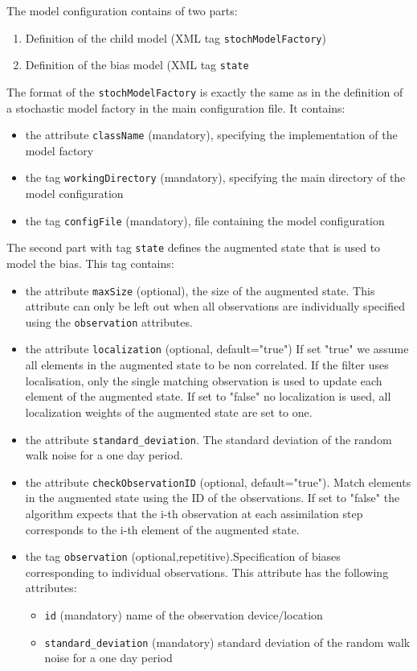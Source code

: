 The model configuration contains of two parts:
\begin{enumerate}
\item Definition of the child model (XML tag {\tt stochModelFactory})
\item Definition of the bias model (XML tag {\tt state}
\end{enumerate}
The format of the {\tt stochModelFactory} is exactly the same as in the definition of a stochastic model factory in the main \oda configuration file. It contains:
\begin{itemize}
\item the attribute {\tt className} (mandatory), specifying the implementation of the model factory
\item the tag {\tt workingDirectory} (mandatory), specifying the main directory of the model configuration
\item  the tag {\tt configFile} (mandatory), file containing the model configuration
\end{itemize} 
The second part with tag {\tt state} defines the augmented state that is used to model the bias. This tag contains:
\begin{itemize}
\item the attribute {\tt maxSize} (optional), the size of the augmented state. This attribute can only be left out when all observations are individually specified using the {\tt observation} attributes.
\item the attribute {\tt localization} (optional, default="true") If set "true" we assume all elements in the augmented state to be non correlated. If the filter uses localisation, only the single matching observation is used to update each element of the augmented state. If set to "false" no localization is used, all localization weights of  the augmented state are set to one.
\item the attribute {\tt standard\_deviation}. The standard deviation of the random walk noise for a one day period.
\item the attribute {\tt checkObservationID} (optional, default="true"). Match elements in the augmented state using the ID of the observations. If set to "false" the algorithm expects that the i-th observation at each assimilation step corresponds to the i-th element of the augmented state.  
\item the tag {\tt observation} (optional,repetitive).Specification of biases corresponding to individual observations. This attribute has the following attributes:
   \begin{itemize}
   \item {\tt id} (mandatory) name of the observation device/location
   \item {\tt standard\_deviation} (mandatory) standard deviation of the random walk noise for a one day
            period
   \end{itemize} 
\end{itemize}

